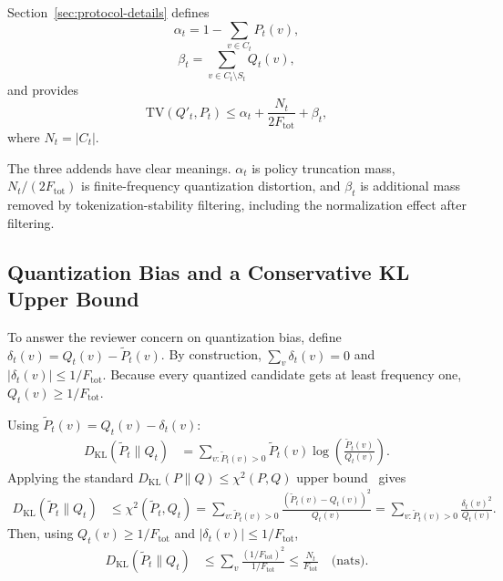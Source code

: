 Section~\ref{sec:protocol-details} defines
\begin{equation}
\alpha_t = 1-\sum_{v\in C_t} P_t(v),
\end{equation}
\begin{equation}
\beta_t = \sum_{v\in C_t\setminus S_t} Q_t(v),
\end{equation}
and provides
\begin{equation}
\mathrm{TV}(Q'_t,P_t)\le\alpha_t + \frac{N_t}{2F_{\mathrm{tot}}} + \beta_t,
\end{equation}
where $N_t=|C_t|$.

The three addends have clear meanings.
$\alpha_t$ is policy truncation mass,
$N_t/(2F_{\mathrm{tot}})$ is finite-frequency quantization distortion,
and $\beta_t$ is additional mass removed by tokenization-stability filtering, including the normalization effect after filtering.

\subsection{Quantization Bias and a Conservative KL Upper Bound}

To answer the reviewer concern on quantization bias, define
$\delta_t(v)=Q_t(v)-\widetilde{P}_t(v)$.
By construction, $\sum_v\delta_t(v)=0$ and $|\delta_t(v)|\le 1/F_{\mathrm{tot}}$.
Because every quantized candidate gets at least frequency one, $Q_t(v)\ge 1/F_{\mathrm{tot}}$.

Using $\widetilde{P}_t(v)=Q_t(v)-\delta_t(v)$:
\begin{align}
D_{\mathrm{KL}}(\widetilde{P}_t\|Q_t)
&=\sum_{v:\widetilde{P}_t(v)>0} \widetilde{P}_t(v)\log\!\left(\frac{\widetilde{P}_t(v)}{Q_t(v)}\right).
\end{align}
Applying the standard $D_{\mathrm{KL}}(P\|Q)\le \chi^2(P,Q)$ upper bound~\cite{tsybakov2009introduction} gives
\begin{align}
D_{\mathrm{KL}}(\widetilde{P}_t\|Q_t)
&\le \chi^2(\widetilde{P}_t,Q_t)
= \sum_{v:\widetilde{P}_t(v)>0} \frac{(\widetilde{P}_t(v)-Q_t(v))^2}{Q_t(v)}
= \sum_{v:\widetilde{P}_t(v)>0} \frac{\delta_t(v)^2}{Q_t(v)}.
\end{align}
Then, using $Q_t(v)\ge 1/F_{\mathrm{tot}}$ and $|\delta_t(v)|\le 1/F_{\mathrm{tot}}$,
\begin{align}
D_{\mathrm{KL}}(\widetilde{P}_t\|Q_t)
&\le \sum_v \frac{(1/F_{\mathrm{tot}})^2}{1/F_{\mathrm{tot}}}
\le \frac{N_t}{F_{\mathrm{tot}}}\quad\text{(nats)}.
\end{align}

